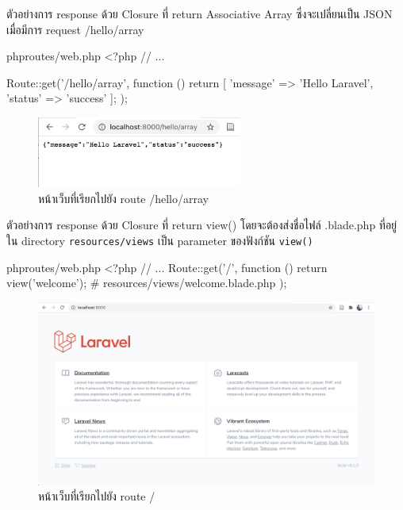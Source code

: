 ตัวอย่างการ response ด้วย Closure ที่ return Associative Array ซึ่งจะเปลี่ยนเป็น JSON
เมื่อมีการ request /hello/array
\begin{code}{php}{routes/web.php}{}
    <?php
    // ... 

    Route::get('/hello/array', function () {
        return [
            'message' => 'Hello Laravel', 
            'status' => 'success'
        ];
    });
\end{code}

\begin{figure}[h!]
    \centering
    \includegraphics[width=0.6\textwidth]{images/ch2/03.png}
    \caption{หน้าเว็บที่เรียกไปยัง route /hello/array}
\end{figure}

ตัวอย่างการ response ด้วย Closure ที่ return view() โดยจะต้องส่งชื่อไฟล์ .blade.php 
ที่อยู่ใน directory \texttt{resources/views} เป็น parameter ของฟังก์ชัน \texttt{view()}

\begin{code}{php}{routes/web.php}{}
    <?php
    // ...
    Route::get('/', function () {
        return view('welcome'); # resources/views/welcome.blade.php
    });
\end{code}

\begin{figure}[h!]
    \centering
    \includegraphics[width=1\textwidth]{images/ch2/01.png}
    \caption{หน้าเว็บที่เรียกไปยัง route /}
\end{figure}

